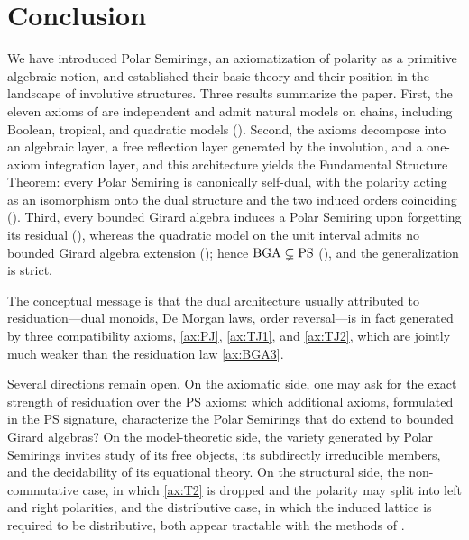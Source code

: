 
\section{Conclusion}\label{sec:conclusion}

We have introduced Polar Semirings, an axiomatization of polarity as a
primitive algebraic notion, and established their basic theory and their
position in the landscape of involutive structures. Three results summarize
the paper. First, the eleven axioms of  are independent and
admit natural models on chains, including Boolean, tropical, and quadratic
models (). Second, the axioms decompose into an algebraic
layer, a free reflection layer generated by the involution, and a one-axiom
integration layer, and this architecture yields the Fundamental Structure
Theorem: every Polar Semiring is canonically self-dual, with the polarity
acting as an isomorphism onto the dual structure and the two induced orders
coinciding (). Third, every bounded Girard algebra
induces a Polar Semiring upon forgetting its residual
(), whereas the quadratic model on the unit
interval admits no bounded Girard algebra extension
(); hence $\mathrm{BGA} \subsetneq \mathrm{PS}$
(), and the generalization is strict.

The conceptual message is that the dual architecture usually attributed to
residuation---dual monoids, De Morgan laws, order reversal---is in fact
generated by three compatibility axioms, \eqref{ax:PJ}, \eqref{ax:TJ1}, and
\eqref{ax:TJ2}, which are jointly much weaker than the residuation law
\eqref{ax:BGA3}.

Several directions remain open. On the axiomatic side, one may ask for the
exact strength of residuation over the PS axioms: which additional axioms,
formulated in the PS signature, characterize the Polar Semirings that do
extend to bounded Girard algebras? On the model-theoretic side, the variety
generated by Polar Semirings invites study of its free objects, its
subdirectly irreducible members, and the decidability of its equational
theory. On the structural side, the non-commutative case, in which
\eqref{ax:T2} is dropped and the polarity may split into left and right
polarities, and the distributive case, in which the induced lattice is
required to be distributive, both appear tractable with the methods of
.
